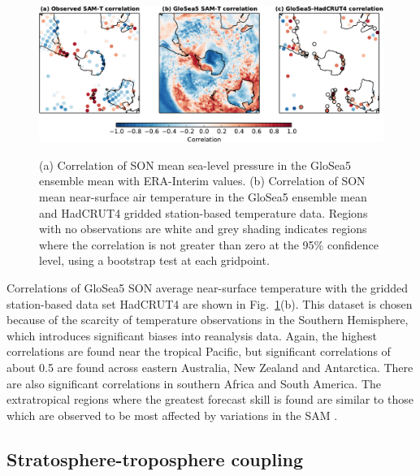 \begin{figure}[t]
  \noindent\includegraphics[width=\textwidth,angle=0]{figures/chapter-seasonal/mslp_tsrf_maps_crop.pdf}\\
  \caption[Correlation of GloSea5 forecasts of sea-level pressure and
temperature.]{(a) Correlation of SON mean sea-level pressure in the GloSea5
ensemble mean with ERA-Interim values. (b) Correlation of SON mean near-surface
air temperature in the GloSea5 ensemble mean and HadCRUT4 gridded station-based
temperature data. Regions with no observations are white and grey shading
indicates regions where the correlation is not greater than zero at the 95\%
confidence level, using a bootstrap test at each gridpoint.}\label{fig:mslp_tsrf_map}
\end{figure}

Correlations of GloSea5 SON average near-surface temperature with the gridded
station-based data set HadCRUT4 \citep{Morice2012} are shown in Fig.\
\ref{fig:mslp_tsrf_map}(b). This dataset is chosen because of the scarcity of
temperature observations in the Southern Hemisphere, which introduces
significant biases into reanalysis data. Again, the highest correlations are
found near the tropical Pacific, but significant correlations of about 0.5 are
found across eastern Australia, New Zealand and Antarctica. There are also
significant correlations in southern Africa and South America. The extratropical
regions where the greatest forecast skill is found are similar to those which
are observed to be most affected by variations in the SAM \citep{Gillett2006}.


\subsection{Stratosphere-troposphere coupling}

